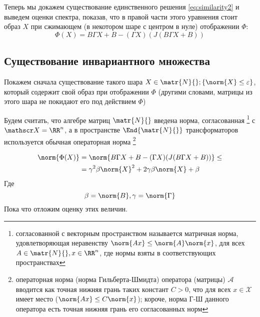 Теперь мы докажем существование единственного решения \eqref{eq:similarity2}
и выведем оценки спектра,
показав, что в правой части этого уравнения стоит образ \( X \)
при сжимающем (в некотором шаре с центром в нуле) отображении \( \Phi \):
\[ \Phi(X) = B \Gamma X + B - (\Gamma X) (J(B\Gamma X + B)) \]

\subsection{Существование инвариантного множества}
Покажем сначала существование такого шара \( X\in\matr{N}{}; \{ \norm{X} \leq \varepsilon \} \),
который содержит свой образ при отображении \( \Phi \)
(другими словами, матрицы из этого шара
 не покидают его под действием \( \Phi \))

Будем считать, что алгебре матриц \( \matr{N}{} \)
введена норма, согласованная%
\footnote{согласованной с векторным пространством называется
матричная норма, удовлетворяющая неравенству \( \norm{A x} \leq \norm{A}\norm{x} \),
для всех \( A\in\matr{N}{}, x\in\RR^n \), где нормы взяты в соответствующих пространствах}
с \( \mathscr X = \RR^n \),
а в пространстве \( \End{\matr{N}{}} \) трансформаторов
используется обычная операторная норма%
\footnote{операторная норма (норма Гильберта-Шмидта)
оператора (матрицы) \( \mathcal A \)
вводится как точная нижняя грань таких констант \( C > 0 \),
что для всех \( x\in\mathscr X\) имеет место
(\( \norm{A x} \leq C \norm{x} \)); короче, норма Г-Ш данного оператора
есть точная нижняя грань его согласованных норм}

\begin{align*}
    \norm{\Phi(X)} &= \norm{B \Gamma X + B - (\Gamma X) (J(B\Gamma X + B))} \leq \\
    &= \gamma^2\beta\norm{X}^2 + 2\gamma\beta\norm{X} + \beta
\end{align*}
Где \[ \beta=\norm{B}, \gamma=\norm{\Gamma} \]
Пока что отложим оценку этих величин.

